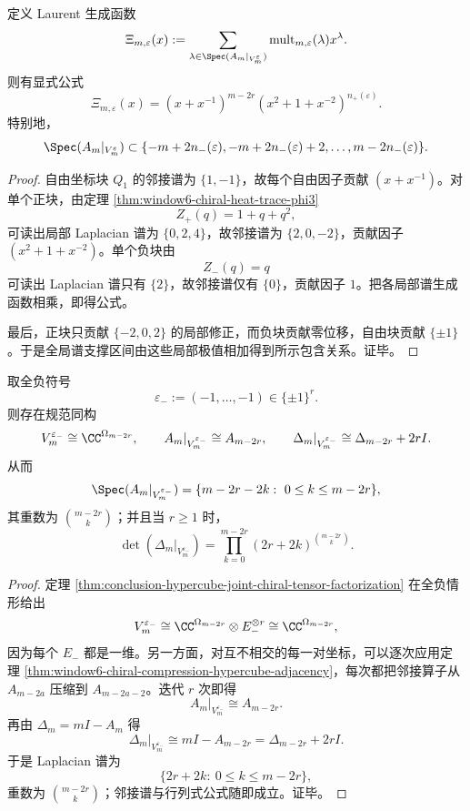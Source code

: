 \begin{theorem}[联合手征块的邻接谱生成函数]\label{thm:conclusion-hypercube-joint-chiral-spectrum-generator}
定义 Laurent 生成函数
\[
\Xi_{m,\varepsilon}(x)
:=
\sum_{\lambda\in\Spec(A_m|_{V_m^\varepsilon})}
\operatorname{mult}_{m,\varepsilon}(\lambda)x^\lambda.
\]
则有显式公式
\[
\Xi_{m,\varepsilon}(x)
=
(x+x^{-1})^{m-2r}(x^2+1+x^{-2})^{n_+(\varepsilon)}.
\]
特别地，
\[
\Spec(A_m|_{V_m^\varepsilon})
\subset
\{-m+2n_-(\varepsilon),-m+2n_-(\varepsilon)+2,\dots,m-2n_-(\varepsilon)\}.
\]
\end{theorem}
\begin{proof}
自由坐标块 \(Q_1\) 的邻接谱为 \(\{1,-1\}\)，故每个自由因子贡献 \((x+x^{-1})\)。对单个正块，由定理 \ref{thm:window6-chiral-heat-trace-phi3}
\[
Z_+(q)=1+q+q^2,
\]
可读出局部 Laplacian 谱为 \(\{0,2,4\}\)，故邻接谱为 \(\{2,0,-2\}\)，贡献因子 \((x^2+1+x^{-2})\)。单个负块由
\[
Z_-(q)=q
\]
可读出 Laplacian 谱只有 \(\{2\}\)，故邻接谱仅有 \(\{0\}\)，贡献因子 \(1\)。把各局部谱生成函数相乘，即得公式。

最后，正块只贡献 \(\{-2,0,2\}\) 的局部修正，而负块贡献零位移，自由块贡献 \(\{\pm1\}\)。于是全局谱支撑区间由这些局部极值相加得到所示包含关系。证毕。
\end{proof}

\begin{theorem}[全负手征塔的精确超立方体压缩]\label{thm:conclusion-hypercube-allnegative-exact-compression}
取全负符号
\[
\varepsilon_-:=(-1,\dots,-1)\in\{\pm1\}^r.
\]
则存在规范同构
\[
V_m^{\varepsilon_-}\cong \CC^{\Omega_{m-2r}},
\qquad
A_m|_{V_m^{\varepsilon_-}}\cong A_{m-2r},
\qquad
\Delta_m|_{V_m^{\varepsilon_-}}\cong \Delta_{m-2r}+2rI.
\]
从而
\[
\Spec(A_m|_{V_m^{\varepsilon_-}})
=
\{m-2r-2k:\ 0\le k\le m-2r\},
\]
其重数为 \(\binom{m-2r}{k}\)；并且当 \(r\ge 1\) 时，
\[
\det(\Delta_m|_{V_m^{\varepsilon_-}})
=
\prod_{k=0}^{m-2r}(2r+2k)^{\binom{m-2r}{k}}.
\]
\end{theorem}
\begin{proof}
定理 \ref{thm:conclusion-hypercube-joint-chiral-tensor-factorization} 在全负情形给出
\[
V_m^{\varepsilon_-}
\cong
\CC^{\Omega_{m-2r}}\otimes E_-^{\otimes r}
\cong
\CC^{\Omega_{m-2r}},
\]
因为每个 \(E_-\) 都是一维。另一方面，对互不相交的每一对坐标，可以逐次应用定理 \ref{thm:window6-chiral-compression-hypercube-adjacency}，每次都把邻接算子从 \(A_{m-2a}\) 压缩到 \(A_{m-2a-2}\)。迭代 \(r\) 次即得
\[
A_m|_{V_m^{\varepsilon_-}}\cong A_{m-2r}.
\]
再由 \(\Delta_m=mI-A_m\) 得
\[
\Delta_m|_{V_m^{\varepsilon_-}}
\cong
mI-A_{m-2r}
=
\Delta_{m-2r}+2rI.
\]
于是 Laplacian 谱为
\[
\{2r+2k:\ 0\le k\le m-2r\},
\]
重数为 \(\binom{m-2r}{k}\)；邻接谱与行列式公式随即成立。证毕。
\end{proof}

